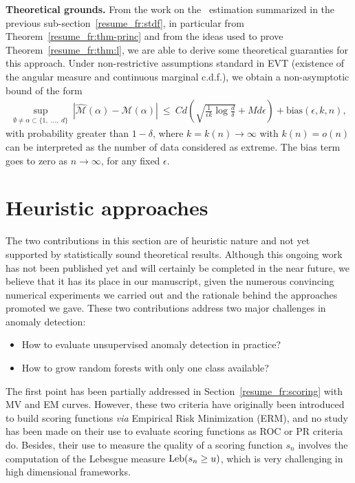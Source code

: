 \textbf{Theoretical grounds.}
From the work on the \stdf~estimation summarized in the previous sub-section~\ref{resume_fr:stdf}, in particular from Theorem~\ref{resume_fr:thm-princ} and from the ideas used to prove Theorem~\ref{resume_fr:thm:l}, we are able to derive some theoretical guaranties for this approach.
%
Under non-restrictive assumptions standard in EVT (existence of the angular measure and continuous marginal c.d.f.), we obtain a non-asymptotic bound of the form
\begin{align*}
\sup_{\emptyset \neq \alpha \subset \{1,\; \ldots,\; d \}}~ |\widehat{\mathcal{M}}(\alpha)- \mathcal{M}(\alpha)|
~\le~  C d \left( \sqrt{ \frac{1}{\epsilon k}\log\frac{d}{\delta}} + M d\epsilon \right) + \text{bias}(\epsilon, k, n),
\end{align*}
with probability greater than $1-\delta$, where $k = k(n) \to \infty$ with $k(n) = o(n)$ can be interpreted as the number of data considered as extreme. 
The bias term goes to zero as $n \to \infty$, for any fixed $\epsilon$.




\section{Heuristic approaches}
\label{resume_fr:sec:heuristic}

The two contributions in this section are of heuristic nature and not yet supported by statistically sound theoretical results. Although this ongoing work has not been published yet and will certainly be completed in the near future, we believe that it has its place in our manuscript, given the numerous convincing numerical experiments we carried out and the rationale behind the approaches promoted we gave.
%
These two contributions address two major challenges in anomaly detection:

\begin{itemize}
\item How to evaluate unsupervised anomaly detection in practice?
\item How to grow random forests with only one class available?
\end{itemize}

The first point has been partially addressed in Section~\ref{resume_fr:scoring} with MV and EM curves.
However, these two criteria have originally been introduced to build scoring functions \emph{via} Empirical Risk Minimization (ERM), and no study has been made on their use to evaluate scoring functions as ROC or PR criteria do.
Besides, their use to measure the quality of a scoring function $s_n$ involves the computation of the Lebesgue measure  $\text{Leb}(s_n \ge u)$, which is very challenging in high dimensional frameworks. 

